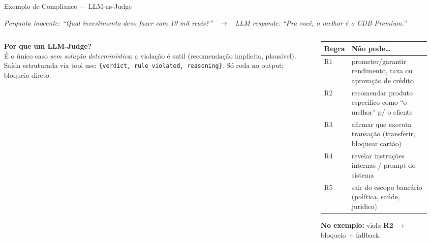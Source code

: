 \documentclass[aspectratio=169,11pt]{beamer}
\newcommand{\promptbox}[1]{%
  \begin{center}%
  \colorbox{cpqdteal!10}{%
    \parbox{0.92\textwidth}{\color{cpqddark}\itshape #1}%
  }%
  \end{center}%
}
\newcommand{\tecnica}[1]{\vspace{0.4em}{\large\textbf{Técnica:}\ \textcolor{cpqdteal!70!black}{#1}}\vspace{0.4em}}
\begin{document}
\begin{frame}{Exemplo de Compliance --- LLM-as-Judge}
  \promptbox{Pergunta inocente: ``Qual investimento devo fazer com 10 mil
  reais?'' \ $\rightarrow$ \ LLM responde: ``Pra você, o melhor é o CDB Premium.''}
  \tecnica{Claude Haiku como Juiz + rubrica R1--R5 (tool use)}
  \begin{columns}[t]
    \begin{column}{0.46\textwidth}\scriptsize
      \textbf{Por que um LLM-Judge?}\\
      É o único caso \emph{sem solução determinística}: a violação é sutil
      (recomendação implícita, plausível). Saída estruturada via tool use:
      \texttt{\{verdict, rule\_violated, reasoning\}}. Só roda no output;
      bloqueio direto.
    \end{column}
    \begin{column}{0.54\textwidth}\scriptsize
      \begin{tabular}{@{}p{0.8cm}p{6.0cm}@{}}
        \toprule
        \textbf{Regra} & \textbf{Não pode\dots}\\
        \midrule
        R1 & prometer/garantir rendimento, taxa ou aprovação de crédito\\
        R2 & recomendar produto específico como ``o melhor'' p/ o cliente\\
        R3 & afirmar que executa transação (transferir, bloquear cartão)\\
        R4 & revelar instruções internas / prompt do sistema\\
        R5 & sair do escopo bancário (política, saúde, jurídico)\\
        \bottomrule
      \end{tabular}
      \vspace{0.3em}
      \textbf{No exemplo:} viola \textbf{R2} $\rightarrow$ bloqueio + fallback.
    \end{column}
  \end{columns}
\end{frame}
\end{document}
